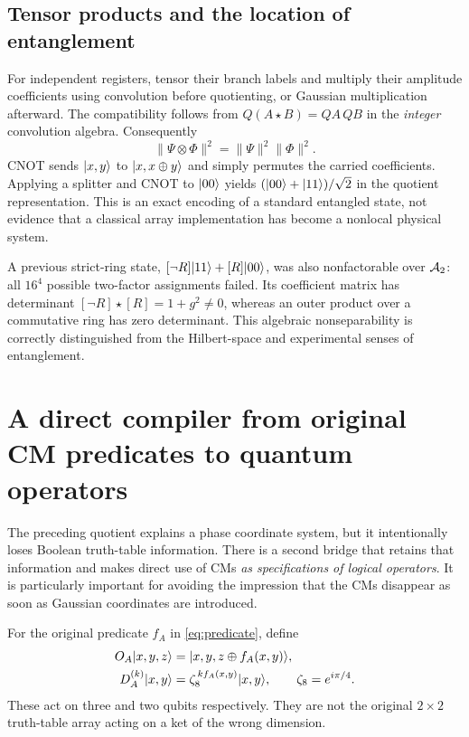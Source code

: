 \subsection{Tensor products and the location of entanglement}
For independent registers, tensor their branch labels and multiply their amplitude coefficients using convolution before quotienting, or Gaussian multiplication afterward. The compatibility follows from $Q(A\star B)=QA\,QB$ in the \emph{integer} convolution algebra. Consequently
\begin{equation}
 \|\Psi\otimes\Phi\|^2=\|\Psi\|^2\|\Phi\|^2.
\end{equation}
CNOT sends $\lvert x,y\rangle$ to $\lvert x,x\oplus y\rangle$ and simply permutes the carried coefficients. Applying a splitter and CNOT to $\lvert 00\rangle$ yields $(\lvert 00\rangle+\lvert 11\rangle)/\sqrt2$ in the quotient representation. This is an exact encoding of a standard entangled state, not evidence that a classical array implementation has become a nonlocal physical system.

A previous strict-ring state, $[\neg R]\lvert 11\rangle+[R]\lvert 00\rangle$, was also nonfactorable over $\mathcal A_2$: all $16^4$ possible two-factor assignments failed. Its coefficient matrix has determinant $[\neg R]\star[R]=1+g^2\ne0$, whereas an outer product over a commutative ring has zero determinant. This algebraic nonseparability is correctly distinguished from the Hilbert-space and experimental senses of entanglement.

\section{A direct compiler from original CM predicates to quantum operators}\label{sec:compiler}
The preceding quotient explains a phase coordinate system, but it intentionally loses Boolean truth-table information. There is a second bridge that retains that information and makes direct use of CMs \emph{as specifications of logical operators}. It is particularly important for avoiding the impression that the CMs disappear as soon as Gaussian coordinates are introduced.

\begin{definition}
For the original predicate $f_A$ in \cref{eq:predicate}, define
\begin{align}
 O_A\lvert x,y,z\rangle&=\lvert x,y,z\oplus f_A(x,y)\rangle,\label{eq:oracle}\\
 D_A^{(k)}\lvert x,y\rangle&=\zeta_8^{\,k f_A(x,y)}\lvert x,y\rangle,
 \qquad\zeta_8=e^{i\pi/4}.\label{eq:phaseoracle}
\end{align}
These act on three and two qubits respectively. They are not the original $2\times2$ truth-table array acting on a ket of the wrong dimension.
\end{definition}

